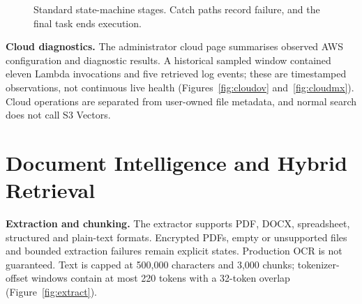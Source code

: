 \begin{figure}[htbp]
\centering
{}
\caption{Standard state-machine stages. Catch paths record failure, and the final task ends execution.}
\label{fig:sfn}
\end{figure}

\textbf{Cloud diagnostics.} The administrator cloud page summarises observed AWS configuration and diagnostic results. A historical sampled window contained eleven Lambda invocations and five retrieved log events; these are timestamped observations, not continuous live health (Figures~\ref{fig:cloudov} and~\ref{fig:cloudmx}). Cloud operations are separated from user-owned file metadata, and normal search does not call S3 Vectors.

\section{Document Intelligence and Hybrid Retrieval}

\textbf{Extraction and chunking.} The extractor supports PDF, DOCX, spreadsheet, structured and plain-text formats. Encrypted PDFs, empty or unsupported files and bounded extraction failures remain explicit states. Production OCR is not guaranteed. Text is capped at 500,000 characters and 3,000 chunks; tokenizer-offset windows contain at most 220 tokens with a 32-token overlap (Figure~\ref{fig:extract}).

